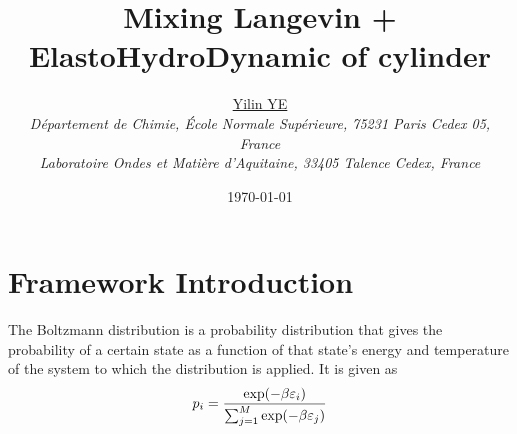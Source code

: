 \documentclass[books,12pt]{elegantpaper}
\title{\textcolor{ChimieBlue}{Mixing Langevin + ElastoHydroDynamic of cylinder}}
\author{\href{https://yiliny.github.io/yiliny/}{{Yilin YE}}\\ \textit{\small{Département de Chimie, École Normale Supérieure, 75231 Paris Cedex 05, France}} \\ \textit{\small{Laboratoire Ondes et Matière d'Aquitaine, 33405 Talence Cedex, France}}}
\date{\today} %
\begin{document}
\maketitle


\tableofcontents %




\newpage
\setcounter{page}{1} %



\section{Framework Introduction}


 The Boltzmann distribution is a probability distribution that gives the probability of a certain state as a function of that state's energy and temperature of the system to which the distribution is applied. It is given as
$$ p_i = \frac{\exp(-\beta \varepsilon_i)}{\sum_{j=1}^M \exp(-\beta \varepsilon_j)} $$

\end{document}
